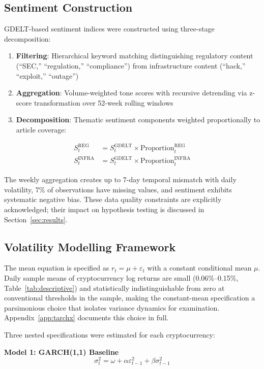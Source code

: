\documentclass[pdflatex,sn-mathphys-num]{sn-jnl}
\theoremstyle{thmstyleone}
\theoremstyle{thmstyletwo}
\theoremstyle{thmstylethree}
\begin{document}
\subsection{Sentiment Construction}

GDELT-based sentiment indices were constructed using three-stage decomposition:
\begin{enumerate}[nosep]
\item \textbf{Filtering}: Hierarchical keyword matching distinguishing regulatory content (``SEC,'' ``regulation,'' ``compliance'') from infrastructure content (``hack,'' ``exploit,'' ``outage'')
\item \textbf{Aggregation}: Volume-weighted tone scores with recursive detrending via z-score transformation over 52-week rolling windows
\item \textbf{Decomposition}: Thematic sentiment components weighted proportionally to article coverage:
\end{enumerate}
\begin{align}
S_t^{\text{REG}} &= S_t^{\text{GDELT}} \times \text{Proportion}_t^{\text{REG}} \\
S_t^{\text{INFRA}} &= S_t^{\text{GDELT}} \times \text{Proportion}_t^{\text{INFRA}}
\end{align}

The weekly aggregation creates up to 7-day temporal mismatch with daily volatility, 7\% of observations have missing values, and sentiment exhibits systematic negative bias. These data quality constraints are explicitly acknowledged; their impact on hypothesis testing is discussed in Section~\ref{sec:results}.

\subsection{Volatility Modelling Framework}

The mean equation is specified as $r_t = \mu + \varepsilon_t$ with a constant conditional mean $\mu$. Daily sample means of cryptocurrency log returns are small (0.06\%--0.15\%, Table~\ref{tab:descriptive}) and statistically indistinguishable from zero at conventional thresholds in the sample, making the constant-mean specification a parsimonious choice that isolates variance dynamics for examination. Appendix~\ref{app:tarchx} documents this choice in full.

Three nested specifications were estimated for each cryptocurrency:

\textbf{Model 1: GARCH(1,1) Baseline}
\begin{equation}
\sigma^2_t = \omega + \alpha \varepsilon^2_{t-1} + \beta \sigma^2_{t-1}
\end{equation}
\end{document}
